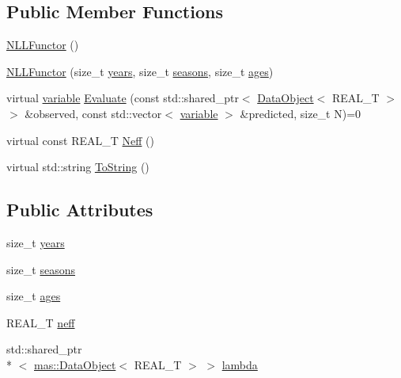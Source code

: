 \subsection*{Public Member Functions}
\begin{DoxyCompactItemize}
\item 
\hyperlink{structmas_1_1_n_l_l_functor_aeab80f44a0ac094884e439c18ae6b685}{N\-L\-L\-Functor} ()
\item 
\hyperlink{structmas_1_1_n_l_l_functor_a47364fea079a116df7f7ad860f977c5a}{N\-L\-L\-Functor} (size\-\_\-t \hyperlink{structmas_1_1_n_l_l_functor_ac76e5d7e0808486b42ffdaea952dd19f}{years}, size\-\_\-t \hyperlink{structmas_1_1_n_l_l_functor_ac59c36239b1817b5bb357bf90dc4802d}{seasons}, size\-\_\-t \hyperlink{structmas_1_1_n_l_l_functor_aa70e461c812bff95770cda5dbb79b6b9}{ages})
\item 
virtual \hyperlink{structmas_1_1_model_object_a4e62fdbb5826f8fac311262b888ab10a}{variable} \hyperlink{structmas_1_1_n_l_l_functor_a463977400e35ad46ef60c334d452cd6c}{Evaluate} (const std\-::shared\-\_\-ptr$<$ \hyperlink{structmas_1_1_data_object}{Data\-Object}$<$ R\-E\-A\-L\-\_\-\-T $>$ $>$ \&observed, const std\-::vector$<$ \hyperlink{structmas_1_1_model_object_a4e62fdbb5826f8fac311262b888ab10a}{variable} $>$ \&predicted, size\-\_\-t N)=0
\item 
virtual const R\-E\-A\-L\-\_\-\-T \hyperlink{structmas_1_1_n_l_l_functor_af86f7157edbcace46138c9b8cb03ddf0}{Neff} ()
\item 
virtual std\-::string \hyperlink{structmas_1_1_n_l_l_functor_accd55442e1e88b423471b67c40860197}{To\-String} ()
\end{DoxyCompactItemize}
\subsection*{Public Attributes}
\begin{DoxyCompactItemize}
\item 
size\-\_\-t \hyperlink{structmas_1_1_n_l_l_functor_ac76e5d7e0808486b42ffdaea952dd19f}{years}
\item 
size\-\_\-t \hyperlink{structmas_1_1_n_l_l_functor_ac59c36239b1817b5bb357bf90dc4802d}{seasons}
\item 
size\-\_\-t \hyperlink{structmas_1_1_n_l_l_functor_aa70e461c812bff95770cda5dbb79b6b9}{ages}
\item 
R\-E\-A\-L\-\_\-\-T \hyperlink{structmas_1_1_n_l_l_functor_ac7fe7be14787477c775c1c628a454118}{neff}
\item 
std\-::shared\-\_\-ptr\\*
$<$ \hyperlink{structmas_1_1_data_object}{mas\-::\-Data\-Object}$<$ R\-E\-A\-L\-\_\-\-T $>$ $>$ \hyperlink{structmas_1_1_n_l_l_functor_a50032d1f03b5743690723c33b62d2b4d}{lambda}
\end{DoxyCompactItemize}


